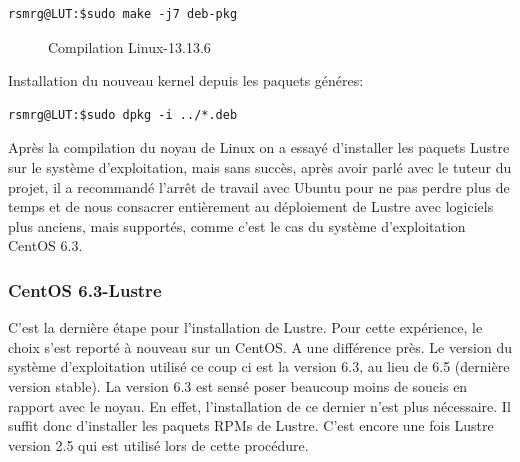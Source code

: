 \documentclass[12pt]{article}
\begin{document}
\begin{verbatim}
rsmrg@LUT:$sudo make -j7 deb-pkg
\end{verbatim}

\begin{figure}[Compilation]
\caption{Compilation Linux-13.13.6}
\label{kernel}
\end{figure}

Installation du nouveau kernel depuis les paquets généres:

\begin{verbatim}
rsmrg@LUT:$sudo dpkg -i ../*.deb
\end{verbatim}

Après la compilation du noyau de Linux on a essayé d'installer les paquets Lustre sur le système d'exploitation, mais sans succès, après avoir parlé avec le tuteur du projet, il a recommandé l'arrêt de travail avec Ubuntu pour  ne pas perdre plus de temps et de nous consacrer entièrement au déploiement de Lustre avec logiciels plus anciens, mais supportés, comme c'est le cas du système d'exploitation CentOS 6.3.

\newpage
\subsubsection{CentOS 6.3-Lustre}
C'est la dernière étape pour l'installation de Lustre. Pour cette expérience, le choix s'est reporté à nouveau sur un CentOS. A une différence près. Le version du système d'exploitation utilisé ce coup ci est la version 6.3, au lieu de 6.5 (dernière version stable). La version 6.3 est sensé poser beaucoup moins de soucis en rapport avec le noyau. En effet, l'installation de ce dernier n'est plus nécessaire. Il suffit donc d'installer les paquets RPMs de Lustre. C'est encore une fois Lustre version 2.5 qui est utilisé lors de cette procédure. 
\end{document}
